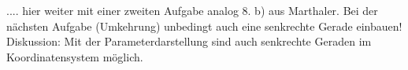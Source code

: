 .... hier weiter mit einer zweiten Aufgabe analog 8. b) aus Marthaler.
Bei der nächsten Aufgabe (Umkehrung) unbedingt auch eine senkrechte
Gerade einbauen! Diskussion: Mit der Parameterdarstellung sind auch
senkrechte Geraden im Koordinatensystem möglich.          


































